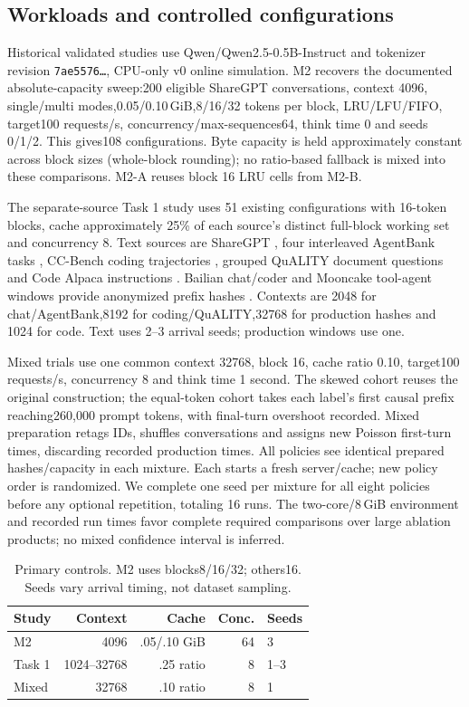 \documentclass{article}
\begin{document}
\subsection{Workloads and controlled configurations}
Historical validated studies use Qwen/Qwen2.5-0.5B-Instruct and tokenizer revision \texttt{7ae5576\ldots}, CPU-only v0 online simulation. M2 recovers the documented absolute-capacity sweep:200 eligible ShareGPT conversations, context 4096, single/multi modes,0.05/0.10\,GiB,8/16/32 tokens per block, LRU/LFU/FIFO, target100 requests/s, concurrency/max-sequences64, think time 0 and seeds 0/1/2. This gives108 configurations. Byte capacity is held approximately constant across block sizes (whole-block rounding); no ratio-based fallback is mixed into these comparisons. M2-A reuses block 16 LRU cells from M2-B.

The separate-source Task 1 study uses 51 existing configurations with 16-token blocks, cache approximately 25\% of each source's distinct full-block working set and concurrency 8. Text sources are ShareGPT \citep{sharegpt}, four interleaved AgentBank tasks \citep{agentbank}, CC-Bench coding trajectories \citep{ccbench}, grouped QuALITY document questions \citep{quality} and Code Alpaca instructions \citep{codealpaca}. Bailian chat/coder and Mooncake tool-agent windows provide anonymized prefix hashes \citep{bailian,mooncake}. Contexts are 2048 for chat/AgentBank,8192 for coding/QuALITY,32768 for production hashes and 1024 for code. Text uses 2--3 arrival seeds; production windows use one.



Mixed trials use one common context 32768, block 16, cache ratio 0.10, target100 requests/s, concurrency 8 and think time 1 second. The skewed cohort reuses the original construction; the equal-token cohort takes each label's first causal prefix reaching260,000 prompt tokens, with final-turn overshoot recorded. Mixed preparation retags IDs, shuffles conversations and assigns new Poisson first-turn times, discarding recorded production times. All policies see identical prepared hashes/capacity in each mixture. Each starts a fresh server/cache; new policy order is randomized. We complete one seed per mixture for all eight policies before any optional repetition, totaling 16 runs. The two-core/8\,GiB environment and recorded run times favor complete required comparisons over large ablation products; no mixed confidence interval is inferred.

\begin{table}[t]
\centering\small
\caption{Primary controls. M2 uses blocks8/16/32; others16. Seeds vary arrival timing, not dataset sampling.}
\begin{tabular}{lrrrl}\toprule
Study & Context & Cache & Conc. & Seeds\\\midrule
M2 & 4096 & .05/.10 GiB & 64 & 3\\
Task 1 & 1024--32768 & .25 ratio & 8 & 1--3\\
Mixed & 32768 & .10 ratio & 8 & 1\\\bottomrule
\end{tabular}
\end{table}
\end{document}
